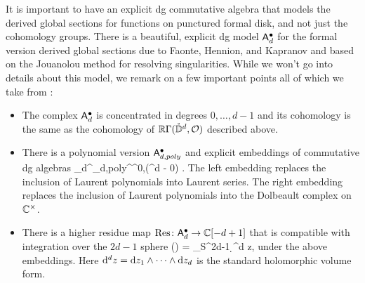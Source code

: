 \documentclass[11pt]{amsart}
\begin{document}
It is important to have an explicit dg commutative algebra that models the derived global sections for functions on punctured formal disk,
and not just the cohomology groups.
There is a beautiful, explicit dg model $\mathsf A^\bullet_d$ for the formal version derived global sections due to Faonte, Hennion, and Kapranov \cite{FHK} and based on the Jouanolou method for resolving singularities. 
While we won't go into details about this model, we remark on a few important points all of which we take from \cite{FHK}:
\begin{itemize}
\item The complex $\mathsf A^\bullet_d$ is concentrated in degrees $0,\ldots,d-1$ and its cohomology is the same as the cohomology of $\mathbb R \Gamma(\mathring{\mathbb D}^d, \mathcal O)$ described above.
\item There is a polynomial version $\mathsf A_{d,poly}^\bullet$ and explicit embeddings of commutative dg algebras 
\beqn
\sfA_{d}^\bu \hookleftarrow \sfA_{d,poly}^\bu \hookrightarrow \Omega^{0,\bu}(\CC^d - 0) .
\eeqn
The left embedding replaces the inclusion of Laurent polynomials into Laurent series.
The right embedding replaces the inclusion of Laurent polynomials into the Dolbeault complex on $\mathbb C^\times$.
\item There is a higher residue map $\text{Res} \colon \mathsf A_d^{\bullet} \to \mathbb C[-d+1]$ that is compatible with integration over the $2d-1$ sphere
\beqn
\label{eq:res}
\Res(\alpha) = \oint_{S^{2d-1}} \alpha \wedge \d^d z,
\eeqn
under the above embeddings.
Here ${\rm d}^d z = {\rm d} z_1 \wedge \cdots \wedge {\rm d} z_d$ is the standard holomorphic volume form.
\end{itemize}



\end{document}
